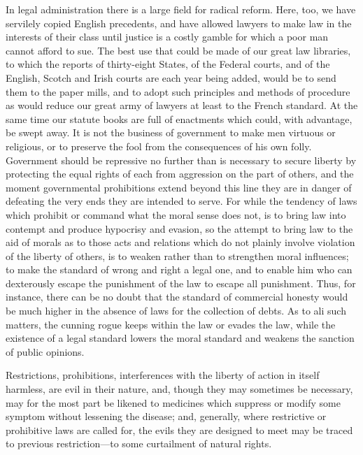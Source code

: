 \documentclass{book}
\begin{document}
In legal administration there is a large field for radical reform. Here, too, we have servilely copied English precedents, and have allowed lawyers to make law in the interests of their class until justice is a costly gamble for which a poor man cannot afford to sue. The best use that could be made of our great law libraries, to which the reports of thirty-eight States, of the Federal courts, and of the English, Scotch and Irish courts are each year being added, would be to send them to the paper mills, and to adopt such principles and methods of procedure as would reduce our great army of lawyers at least to the French standard. At the same time our statute books are full of enactments which could, with advantage, be swept away. It is not the business of government to make men virtuous or religious, or to preserve the fool from the consequences of his own folly. Government should be repressive no further than is necessary to secure liberty by protecting the equal rights of each from aggression on the part of others, and the moment governmental prohibitions extend beyond this line they are in danger of defeating the very ends they are intended to serve. For while the tendency of laws which prohibit or command what the moral sense does not, is to bring law into contempt and produce hypocrisy and evasion, so the attempt to bring law to the aid of morals as to those acts and relations which do not plainly involve violation of the liberty of others, is to weaken rather than to strengthen moral influences; to make the standard of wrong and right a legal one, and to enable him who can dexterously escape the punishment of the law to escape all punishment. Thus, for instance, there can be no doubt that the standard of commercial honesty would be much higher in the absence of laws for the collection of debts. As to ali such matters, the cunning rogue keeps within the law or evades the law, while the existence of a legal standard lowers the moral standard and weakens the sanction of public opinions.

Restrictions, prohibitions, interferences with the liberty of action in itself harmless, are evil in their nature, and, though they may sometimes be necessary, may for the most part be likened to medicines which suppress or modify some symptom without lessening the disease; and, generally, where restrictive or prohibitive laws are called for, the evils they are designed to meet may be traced to previous restriction—to some curtailment of natural rights.
\end{document}
